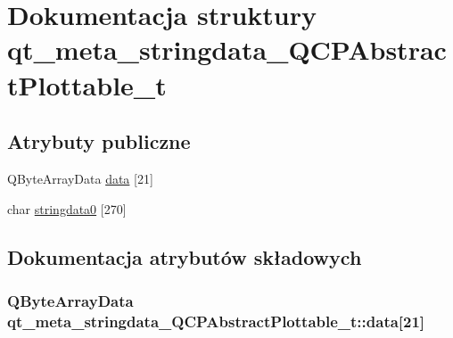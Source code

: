 \hypertarget{structqt__meta__stringdata___q_c_p_abstract_plottable__t}{}\section{Dokumentacja struktury qt\+\_\+meta\+\_\+stringdata\+\_\+\+Q\+C\+P\+Abstract\+Plottable\+\_\+t}
\label{structqt__meta__stringdata___q_c_p_abstract_plottable__t}
\subsection*{Atrybuty publiczne}
\begin{DoxyCompactItemize}
\item 
Q\+Byte\+Array\+Data \hyperlink{structqt__meta__stringdata___q_c_p_abstract_plottable__t_aaf0620f4cc407349bff54eddf41fef33}{data} \mbox{[}21\mbox{]}
\item 
char \hyperlink{structqt__meta__stringdata___q_c_p_abstract_plottable__t_a397cb51ceb93b62e1fb7a828768255e4}{stringdata0} \mbox{[}270\mbox{]}
\end{DoxyCompactItemize}


\subsection{Dokumentacja atrybutów składowych}
\subsubsection[{\texorpdfstring{data}{data}}]{\setlength{\rightskip}{0pt plus 5cm}Q\+Byte\+Array\+Data qt\+\_\+meta\+\_\+stringdata\+\_\+\+Q\+C\+P\+Abstract\+Plottable\+\_\+t\+::data\mbox{[}21\mbox{]}}\hypertarget{structqt__meta__stringdata___q_c_p_abstract_plottable__t_aaf0620f4cc407349bff54eddf41fef33}{}\label{structqt__meta__stringdata___q_c_p_abstract_plottable__t_aaf0620f4cc407349bff54eddf41fef33}
